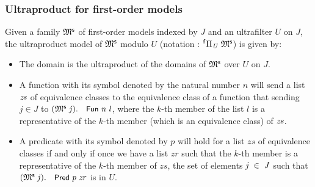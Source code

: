 \documentclass{llncs}
\renewcommand{\HOLConst}[1]{{\textsf{\upshape\small #1}}}
\renewcommand{\HOLinline}[1]{\ensuremath{#1}}
\renewcommand{\HOLFieldName}[1]{\HOLConst{#1}}
\begin{document}
\subsubsection{Ultraproduct for first-order models}
Given a family \HOLinline{\HOLFreeVar{\ensuremath{\mathfrak{M}\sp{\sf s}}}} of first-order models indexed by $J$ and an ultrafilter $U$ on $J$, the ultraproduct model of \HOLinline{\HOLFreeVar{\ensuremath{\mathfrak{M}\sp{\sf s}}}} modulo $U$ (notation : \HOLinline{{}^{\sf f}\Pi\sb{\HOLFreeVar{U}}\;\HOLFreeVar{\ensuremath{\mathfrak{M}\sp{\sf s}}}}) is given by:

\begin{itemize}
\item The domain is the ultraproduct of the domains of \HOLinline{\HOLFreeVar{\ensuremath{\mathfrak{M}\sp{\sf s}}}} over $U$ on $J$.
\item A function with its symbol denoted by the natural number $n$ will send a list \HOLinline{\HOLFreeVar{zs}} of equivalence classes to the equivalence class of a function that sending $j\in J$ to \HOLinline{(\HOLFreeVar{\ensuremath{\mathfrak{M}\sp{\sf s}}}\;\HOLFreeVar{j}).\HOLFieldName{Fun}\;\HOLFreeVar{n}\;\HOLFreeVar{l}}, where the $k$-th member of the list $l$ is a representative of the $k$-th member (which is an equivalence class) of \HOLinline{\HOLFreeVar{zs}}. 

\item A predicate with its symbol denoted by $p$ will hold for a list $zs$ of equivalence classes if and only if once we have a list $zr$ such that the $k$-th member is a representative of the $k$-th member of $zs$, the set of elements \HOLinline{\HOLFreeVar{j}\;\HOLSymConst{\HOLTokenIn{}}\;\HOLFreeVar{J}} such that \HOLinline{(\HOLFreeVar{\ensuremath{\mathfrak{M}\sp{\sf s}}}\;\HOLFreeVar{j}).\HOLFieldName{Pred}\;\HOLFreeVar{p}\;\HOLFreeVar{zr}} is in $U$. 
\end{itemize}
\end{document}
